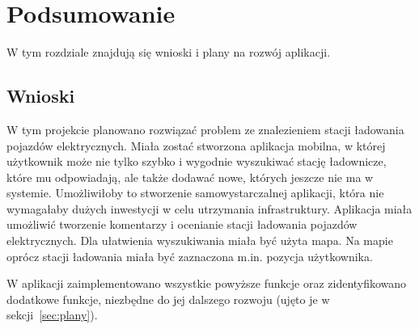 \chapter{Podsumowanie}
W tym rozdziale znajdują się wnioski i plany na rozwój aplikacji.

\section{Wnioski}


W tym projekcie planowano rozwiązać problem ze znalezieniem stacji ładowania pojazdów elektrycznych. Miała zostać stworzona aplikacja mobilna, w której użytkownik może nie tylko szybko i wygodnie wyszukiwać stację ładownicze, które mu odpowiadają, ale także dodawać nowe, których jeszcze nie ma w systemie.
Umożliwiłoby to stworzenie samowystarczalnej aplikacji, która nie wymagałaby dużych inwestycji w celu utrzymania infrastruktury. Aplikacja miała umożliwić tworzenie komentarzy i ocenianie stacji ładowania pojazdów elektrycznych. Dla ułatwienia wyszukiwania miała być użyta mapa.
Na mapie oprócz stacji ładowania miała być zaznaczona m.in. pozycja użytkownika.

W aplikacji zaimplementowano wszystkie powyższe funkcje oraz zidentyfikowano dodatkowe funkcje, niezbędne do jej dalszego rozwoju (ujęto je w sekcji~\ref{sec:plany}).

